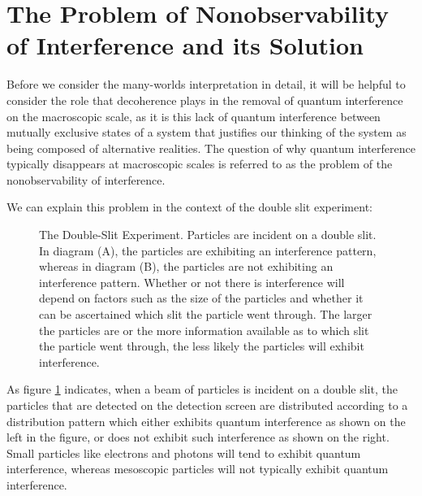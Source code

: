\documentclass[letter, 12pt]{turabian-thesis}
\theoremstyle{hypothesis}
\begin{document}
\section{\label{Nonobservability} The Problem of Nonobservability of  Interference and its Solution\protect\footnotemark}Before we consider the many-worlds interpretation in detail, it will be helpful to consider the role that decoherence plays in the removal of quantum interference on the macroscopic scale, as it is this lack of quantum  interference between mutually exclusive states of a system that justifies our thinking of the system as being composed of alternative realities. The question of why quantum interference typically disappears at macroscopic scales is referred to as the problem of the nonobservability of interference. 

We can explain this problem in the context of the double slit experiment:
\begin{figure}[ht!]
\captionsetup{justification=justified}
\centering
{}
\vspace*{10px}
\caption{The Double-Slit Experiment. Particles are incident on a double slit. In diagram (A), the particles are exhibiting an interference pattern, whereas in diagram (B), the particles are not exhibiting an interference pattern. Whether or not there is interference will depend on factors such as the size of the particles and whether it can be ascertained which slit the particle went through. The larger the particles are or the more information available as to which slit the particle went through, the less likely the particles will exhibit interference.\protect\footnotemark}
\label{DoubleSlit}
\end{figure}
As figure \ref{DoubleSlit} indicates, when a beam of particles is incident on a double slit, the particles that are detected on the detection screen are distributed according to a distribution pattern which either exhibits quantum interference as shown on the left in the figure, or does not exhibit such interference as shown on the right. Small particles like electrons and photons will tend to exhibit quantum interference, whereas mesoscopic particles  will not typically exhibit quantum interference. 
\end{document}
